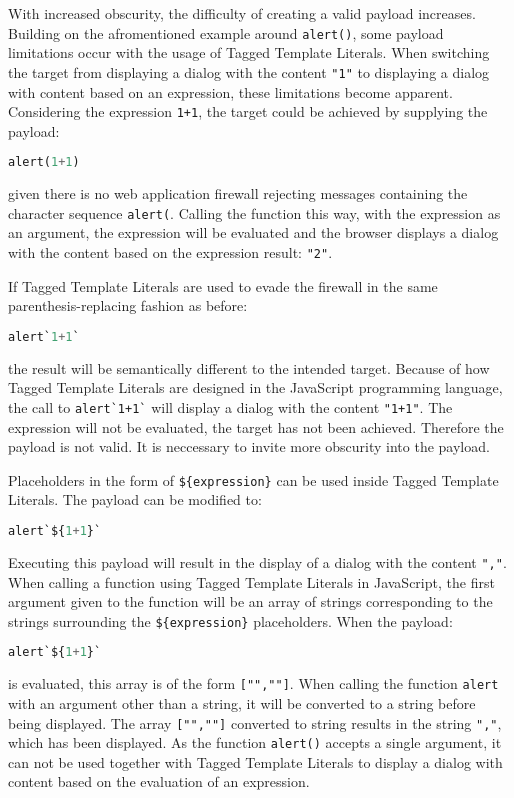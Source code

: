 With increased obscurity, the difficulty of creating a valid payload increases. Building on the afromentioned example around \verb|alert()|, some payload limitations occur with the usage of Tagged Template Literals. When switching the target from displaying a dialog with the content \verb|"1"| to displaying a dialog with content based on an expression, these limitations become apparent. Considering the expression \verb|1+1|, the target could be achieved by supplying the payload:
\begin{lstlisting}[style=basicStyle, language=Python]
alert(1+1)
\end{lstlisting}
given there is no web application firewall rejecting messages containing the character sequence \verb|alert(|. Calling the function this way, with the expression as an argument, the expression will be evaluated and the browser displays a dialog with the content based on the expression result: \verb|"2"|.

If Tagged Template Literals are used to evade the firewall in the same parenthesis-replacing fashion as before: 
\begin{lstlisting}[style=basicStyle, language=Python]
alert`1+1`
\end{lstlisting}
the result will be semantically different to the intended target.
Because of how Tagged Template Literals are designed in the JavaScript programming language, the call to \verb|alert`1+1`| will display a dialog with the content \verb|"1+1"|. The expression will not be evaluated, the target has not been achieved. Therefore the payload is not valid. It is neccessary to invite more obscurity into the payload. 

Placeholders in the form of \verb|${expression}| can be used inside Tagged Template Literals. The payload can be modified to:
\begin{lstlisting}[style=basicStyle, language=Python]
alert`${1+1}`
\end{lstlisting}
Executing this payload will result in the display of a dialog with the content \verb|","|. When calling a function using Tagged Template Literals in JavaScript, the first argument given to the function will be an array of strings corresponding to the strings surrounding the \verb|${expression}| placeholders. 
When the payload:
\begin{lstlisting}[style=basicStyle, language=Python]
alert`${1+1}`
\end{lstlisting}
is evaluated, this array is of the form \verb|["",""]|. When calling the function \verb|alert| with an argument other than a string, it will be converted to a string before being displayed. The array \verb|["",""]| converted to string results in the string \verb|","|, which has been displayed. 
As the function \verb|alert()| accepts a single argument, it can not be used together with Tagged Template Literals to display a dialog with content based on the evaluation of an expression.


